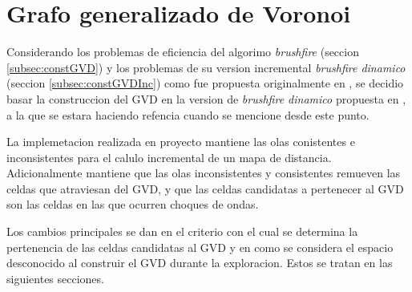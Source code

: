 





\section{Grafo generalizado de Voronoi}\label{sec:MiConstGVD}

Considerando los problemas de eficiencia del algorimo \emph{brushfire} (seccion
\ref{subsec:constGVD}) y los problemas de su version incremental
\emph{brushfire dinamico} (seccion \ref{subsec:constGVDInc}) como fue propuesta
originalmente en \cite{kalra2009incremental}, se decidio basar la construccion
del GVD en la version de \emph{brushfire dinamico} propuesta en \cite{Lau2013},
a la que se estara haciendo refencia cuando se mencione  desde este punto.


La implemetacion realizada en proyecto mantiene las olas conistentes e
inconsistentes para el calulo incremental de un mapa de distancia.
Adicionalmente mantiene que las olas inconsistentes y consistentes remueven las
celdas que atraviesan del GVD, y que las celdas candidatas a pertenecer al GVD
son las celdas en las que ocurren choques de ondas.

Los cambios principales se dan en el criterio con el cual se determina la
pertenencia de las celdas candidatas al GVD y en como se considera el espacio
desconocido al construir el GVD durante la exploracion. Estos se tratan en las
siguientes secciones.


